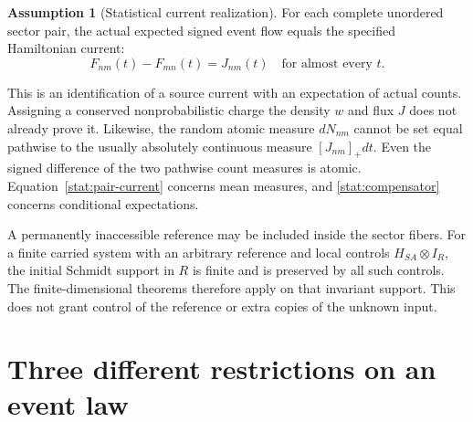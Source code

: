 \documentclass[11pt,oneside,openany]{book}
\theoremstyle{definition}
\newtheorem{assumption}[theorem]{Assumption}
\theoremstyle{remark}\newtheorem{remark}[theorem]{Remark}
\begin{document}
\begin{assumption}[Statistical current realization]\label{stat:matching}
For each complete unordered sector pair, the actual expected signed event
flow equals the specified Hamiltonian current:
\begin{equation}\label{stat:pair-current}
 F_{nm}(t)-F_{mn}(t)=J_{nm}(t)
 \quad\text{for almost every }t.
\end{equation}
\end{assumption}

This is an identification of a source current with an expectation of actual
counts. Assigning a conserved nonprobabilistic charge the density $w$ and
flux $J$ does not already prove it. Likewise, the random atomic measure
$dN_{nm}$ cannot be set equal pathwise to the usually absolutely continuous
measure $[J_{nm}]_+dt$. Even the signed difference of the two pathwise count
measures is atomic. Equation~\eqref{stat:pair-current} concerns mean measures,
and \eqref{stat:compensator} concerns conditional expectations.

A permanently inaccessible reference may be included inside the sector
fibers. For a finite carried system with an arbitrary reference and local
controls $H_{SA}\otimes I_R$, the initial Schmidt support in $R$ is finite and
is preserved by all such controls. The finite-dimensional theorems therefore
apply on that invariant support. This does not grant control of the reference
or extra copies of the unknown input.

\section{Three different restrictions on an event law}
\end{document}
